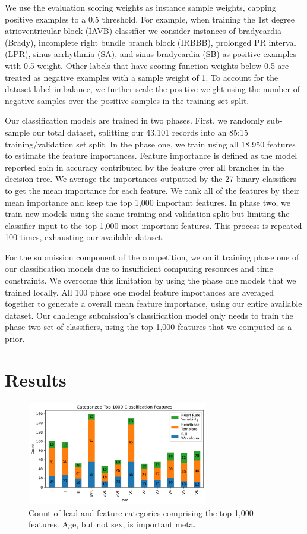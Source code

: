 \documentclass[twocolumn]{cinc}
\begin{document}
We use the evaluation scoring weights as instance sample weights, capping positive examples to a 0.5 threshold.
For example, when training the 1st degree atrioventricular block (IAVB) classifier we consider instances of bradycardia (Brady), incomplete right bundle branch block (IRBBB), prolonged PR interval (LPR), sinus arrhythmia (SA), and sinus bradycardia (SB) as positive examples with 0.5 weight.
Other labels that have scoring function weights below 0.5 are treated as negative examples with a sample weight of 1.
To account for the dataset label imbalance, we further scale the positive weight using the number of negative samples over the positive samples in the training set split.

Our classification models are trained in two phases.
First, we randomly sub-sample our total dataset, splitting our 43,101 records into an 85:15 training/validation set split.
In the phase one, we train using all 18,950 features to estimate the feature importances.
Feature importance is defined as the model reported gain in accuracy contributed by the feature over all branches in the decision tree.
We average the importances outputted by the 27 binary classifiers to get the mean importance for each feature.
We rank all of the features by their mean importance and keep the top 1,000 important features.
In phase two, we train new models using the same training and validation split but limiting the classifier input to the top 1,000 most important features.
This process is repeated 100 times, exhausting our available dataset.

For the submission component of the competition, we omit training phase one of our classification models due to insufficient computing resources and time constraints.
We overcome this limitation by using the phase one models that we trained locally.
All 100 phase one model feature importances are averaged together to generate a overall mean feature importance, using our entire available dataset.
Our challenge submission's classification model only needs to train the phase two set of classifiers, using the top 1,000 features that we computed as a prior.

\section{Results}

\begin{figure}[ht]
  \centering
  \includegraphics[width=7.9cm]{fig/top_features_bar.png}
  \caption{Count of lead and feature categories comprising the top 1,000 features. Age, but not sex, is important meta.}
  \label{fig:top_features}
\end{figure}
\end{document}
